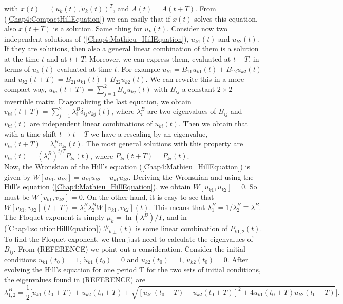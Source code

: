 \documentclass[11pt,a4paper,twoside]{book}
\begin{document}
with $ x(t)=(u_{k}(t),\dot{u}_{k}(t))^{T} $, and $ A(t)=A(t+T) $. From (\ref{Chap4:CompactHillEquation}) we can easily that if $ x(t) $ solves this equation, also $ x(t+T) $ is a solution. Same thing for $ u_{k}(t) $. Consider now two independent solutions of (\ref{Chap4:Mathieu_HillEquation}), $ u_{k1}(t) $ and $ u_{k2}(t) $. If they are solutions, then also a general linear combination of them is a solution at the time $ t $ and at $ t+T $. Moreover, we can express them, evaluated at $ t+T $, in terms of $ u_{k}(t) $ evaluated at time $ t $. For example  $ u_{k1}=B_{11}u_{k1}(t) + B_{12}u_{k2}(t) $ and $ u_{k2}(t+T)=B_{21}u_{k1}(t) + B_{22}u_{k2}(t) $. We can rewrite this in a more compact way, $ u_{ki}(t+T)= \sum_{j=1}^{2}B_{ij}u_{kj}(t) $ with $ B_{ij} $ a constant $ 2\times 2 $ invertible matix. Diagonalizing the last equation, we obtain $ v_{ki}(t+T)=\sum_{j=1}^{2}\lambda_{i}^{B}\delta_{ij}v_{kj}(t) $, where $ \lambda_{i}^{B} $ are two eigenvalues of $ B_{ij} $ and $ v_{ki}(t) $ are independent linear combinations of $ u_{ki}(t) $. Then we obtain that with a time shift $ t \rightarrow t+T $ we have a rescaling by an eigenvalue, $ v_{ki}(t+T)=\lambda_{i}^{B}v_{ki}(t) $. 
The most general solutions with this property are $ v_{ki}(t)=(\lambda_{i}^{B})^{t/T}P_{ki}(t) $, where $ P_{ki}(t+T)=P_{ki}(t) $. \\ Now, the Wronskian of the Hill's equation (\ref{Chap4:Mathieu_HillEquation}) is given by $ W[u_{k1},u_{k2}]=u_{k1}\dot{u}_{k2}-\dot{u}_{k1}u_{k2} $. Deriving the Wronskian and using the Hill's equation (\ref{Chap4:Mathieu_HillEquation}), we obtain $ \dot{W}[u_{k1},u_{k2}]=0 $. So must be $ \dot{W}[v_{k1},v_{k2}]=0$. On the other hand, it is easy to see that $ W[v_{k1},v_{k2}](t+T) = \lambda_{1}^{B}\lambda_{2}^{B}W[v_{k1},v_{k2}](t) $. This means that $ \lambda_{1}^{B}=1/\lambda^{B}_{2} \equiv \lambda^{B} $. The Floquet exponent is simply $ \mu_{k} = \ln(\lambda^{B})/T $, and in (\ref{Chap4:solutionHillEquation}) $\mathcal{P}_{k\pm}(t)$ is some linear combination of $ P_{k1,2}(t) $.\\ To find the Floquet exponent, we then just need to calculate the eigenvalues of $ B_{ij} $. From (REFERENCE) we point out a consideration. Consider the initial conditions $ u_{k1}(t_{0}) = 1 $, $ \dot{u}_{k1}(t_{0})=0 $ and $ u_{k2}(t_{0}) = 1 $, $ \dot{u}_{k2}(t_{0})=0 $. After evolving the Hill's equation for one period T for the two sets of initial conditions, the eigenvalues found in (REFERENCE) are 
\begin{equation}
\lambda_{1,2}^{B}=\frac{1}{2}\Bigg[u_{k1}(t_{0} + T) + \dot{u}_{k2}(t_{0} + T)  \pm \sqrt{[u_{k1}(t_{0} + T) - \dot{u}_{k2}(t_{0} + T)]^{2} + 4\dot{u}_{k1}(t_{0}+T)u_{k2}(t_{0} + T)}\Bigg].
\end{equation}
\end{document}
